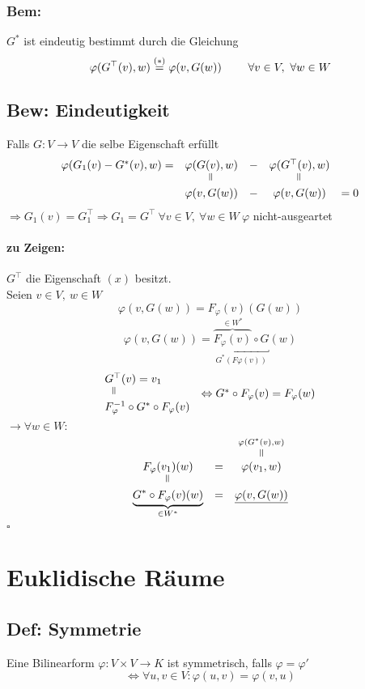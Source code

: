 \documentclass[titlepage,12pt,a4paper,ngerman]{report}
\newenvironment{bew}[1]{\subsection{Bew: #1}}{\hfill$\square$}
\newcommand{\Bew}[2]{\begin{bew}{#1}#2\end{bew}}
\newcommand{\verteq}{\rotatebox{90}{$\,=$}}
\newcommand{\equaltoup}[2]{\overset{\scriptstyle\underset{\mkern4mu\verteq}{#2}}{#1}}
\begin{document}
\subsubsection*{Bem:}
$G^*$ ist eindeutig bestimmt durch die Gleichung 
$$\varphi(G^\top(v),w) \buildrel (*) \over = \varphi(v,G(w))\qquad \ \forall v \in V,\ \forall w \in W$$
\Bew{Eindeutigkeit}{
	Falls $G:V\to V$ die selbe Eigenschaft erfüllt
	$$ \begin{array}{ccccc}
	\varphi(G_1(v) - G^* (v),w) = & \varphi(G(v),w) & - & \varphi (G^\top (v),w) \\
	& \verteq & &  \verteq \\
	& \varphi(v, G(w)) & - & \varphi(v,G(w)) & = 0
	\end{array}$$
	$\Rightarrow G_1(v) = G_1^\top \Rightarrow G_1=G^\top\ \forall v \in V,\ \forall w \in W\ \varphi$ nicht-ausgeartet 
	\paragraph{zu Zeigen:} $G^\top$ die Eigenschaft $(x)$ besitzt.\\
	Seien \underline{$v \in V,\ w \in W$} 
	$$\varphi(v,G(w)) = F_\varphi(v)(G(w))$$
	$$\varphi(v,G(w)) = \underbracket{\overbrace{F_\varphi(v)}^{\in W^*} \circ G}_{G^*(F\varphi(v))}(w)$$
	$$ \begin{array}{lc}
	G^\top(v)  = v_1 \\
	\ \ \verteq & \Leftrightarrow G^* \circ F_\varphi(v) = F_\varphi(w)\\
	F^{-1}_{\varphi}\circ G^* \circ F_\varphi(v)
	\end{array}$$
	$\rightarrow \forall w \in W:$
	$$\begin{array}{ccc}
	F_\varphi(v_1)(w) & = & \equaltoup{\varphi(v_1,w)}{\varphi(G^*(v),w)}\\
	\verteq \\
	\underbrace{G^* \circ F_\varphi(v)(w)}_{\in W^*} & = & \underline{\varphi(v,G(w))}
	\end{array}$$
}

\section{Euklidische Räume}
\subsection{Def: Symmetrie}
Eine Bilinearform $ \varphi: V \times V \to K$ ist symmetrisch, falls $ \varphi = \varphi' $ 
$$ \Leftrightarrow \forall u,v \in V : \varphi(u,v) = \varphi(v,u) $$
\end{document}
